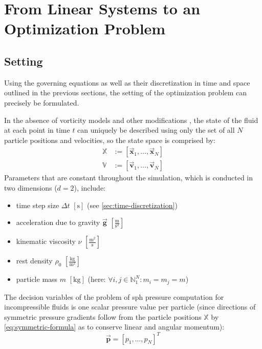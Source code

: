 \documentclass[conference]{IEEEtran}
\newcommand\vek[1]{\vec{\bm{#1}}}
\newcommand\mat[1]{{\mathds{#1}}}
\begin{document}
\section{From Linear Systems to an Optimization Problem}
\subsection{Setting}
Using the governing equations as well as their discretization in time and space outlined in the previous sections, the setting of the optimization problem can precisely be formulated. 

In the absence of vorticity models and other modifications \autocite{tutorial2019}, the state of the fluid at each point in time $t$ can uniquely be described using only the set of all $N$ particle positions and velocities, so the state space is comprised by:
\begin{align}
  \mat{X} &:= \left[\vek{x}_1, \dots, \vek{x}_N\right]\\
  \mat{V} &:= \left[\vek{v}_1, \dots, \vek{v}_N\right]
\end{align}
Parameters that are constant throughout the simulation, which is conducted in two dimensions ($d=2$), include:
\begin{itemize}
\item time step size $\Delta t$ $[\text{s}]$ (see \autoref{sec:time-discretization})
\item acceleration due to gravity $\vek{g}$ $[\frac{\text{m}}{\text{s}^2}]$
\item kinematic viscosity $\nu$ $[\frac{\text{m}^2}{\text{s}}]$
\item rest density $\rho_0$ $[\frac{\text{kg}}{\text{m}^2}]$
\item particle mass $m$ $[\text{kg}]$ (here: $\forall i,j\in\mathds{N}_1^N: m_i = m_j = m$)
\end{itemize}

The decision variables of the problem of \ac{sph} pressure computation for incompressible fluids is one scalar pressure value per particle (since directions of symmetric pressure gradients follow from the particle positions $\mat{X}$ by \autoref{eq:symmetric-formula} as to conserve linear and angular momentum):
\begin{equation}
  \vek{p} = \left[ p_1, \dots, p_N \right]^T
\end{equation}
\end{document}
